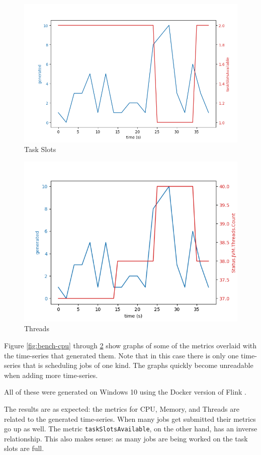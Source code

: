 \begin{figure}
   \centering
   \includegraphics[scale=0.60]{figures/task-slots.png}
\caption{Task Slots}    
\label{fig:bench-taks}
\end{figure}

\begin{figure}
   \centering
   \includegraphics[scale=0.70]{figures/threads.png}
\caption{Threads}    
\label{fig:bench-threads}
\end{figure}

Figure \ref{fig:bench-cpu} through \ref{fig:bench-threads} show graphs of some of the metrics overlaid with the time-series that generated them. Note that in this case there is only one time-series that is scheduling jobs of one kind. The graphs quickly become unreadable when adding more time-series. 

All of these were generated on Windows 10 using the Docker version of Flink \parencite{flinkdocker}.

The results are as expected: the metrics for CPU, Memory, and Threads are related to the generated time-series. When many jobs get submitted their metrics go up as well. The metric \texttt{taskSlotsAvailable}, on the other hand, has an inverse relationship. This also makes sense: as many jobs are being worked on the task slots are full. 